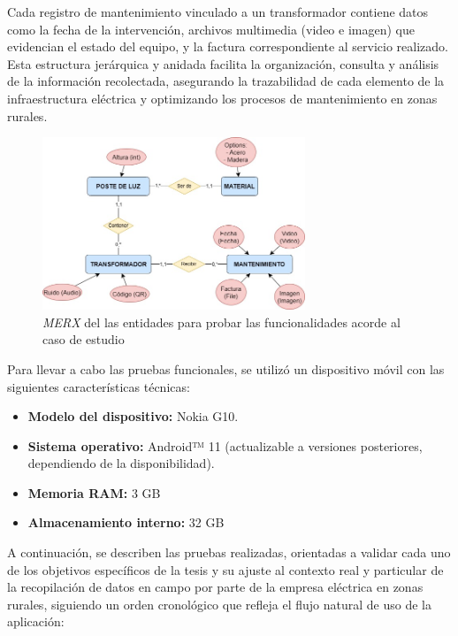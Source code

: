 \documentclass[12pt, a4paper]{book}
\begin{document}
Cada registro de mantenimiento vinculado a un transformador contiene datos como la fecha de la intervención, archivos multimedia (video e imagen) que evidencian el estado del equipo, y la factura correspondiente al servicio realizado. Esta estructura jerárquica y anidada facilita la organización, consulta y análisis de la información recolectada, asegurando la trazabilidad de cada elemento de la infraestructura eléctrica y optimizando los procesos de mantenimiento en zonas rurales.

\begin{figure}[H]
  \centering
  \includegraphics[width=0.7\textwidth]{images/functionality_test/caso_estudio.jpg}
  \caption{\textit{MERX} del las entidades para probar las funcionalidades acorde al caso de estudio}
  \label{fig:casoestudio}
\end{figure}

Para llevar a cabo las pruebas funcionales, se utilizó un dispositivo móvil con las siguientes características técnicas:

\begin{itemize}
    \item \textbf{Modelo del dispositivo:} Nokia G10.
    \item \textbf{Sistema operativo:} Android™ 11 (actualizable a versiones posteriores, dependiendo de la disponibilidad).
    \item \textbf{Memoria RAM:} 3 GB
    \item \textbf{Almacenamiento interno:} 32 GB
\end{itemize}

A continuación, se describen las pruebas realizadas, orientadas a validar cada uno de los objetivos específicos de la tesis y su ajuste al contexto real y particular de la recopilación de datos en campo por parte de la empresa eléctrica en zonas rurales, siguiendo un orden cronológico que refleja el flujo natural de uso de la aplicación:
\end{document}
